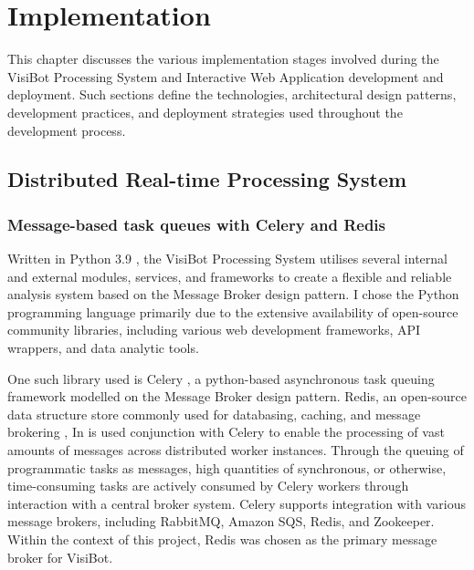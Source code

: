
\chapter{Implementation}


This chapter discusses the various implementation stages involved during the VisiBot Processing System and Interactive Web Application development and deployment. Such sections define the technologies, architectural design patterns, development practices, and deployment strategies used throughout the development process.

\section{Distributed Real-time Processing System}

\subsection{Message-based task queues with Celery and Redis}

Written in Python 3.9 \citep{Python39}, the VisiBot Processing System utilises several internal and external modules, services, and frameworks to create a flexible and reliable analysis system based on the Message Broker design pattern. I chose the Python programming language primarily due to the extensive availability of open-source community libraries, including various web development frameworks, API wrappers, and data analytic tools.

One such library used is Celery \citep{Celery}, a python-based asynchronous task queuing framework modelled on the Message Broker design pattern. Redis, an open-source data structure store commonly used for databasing, caching, and message brokering \citep{Redis}, In is used conjunction with Celery to enable the processing of vast amounts of messages across distributed worker instances. Through the queuing of programmatic tasks as messages, high quantities of synchronous, or otherwise, time-consuming tasks are actively consumed by Celery workers through interaction with a central broker system. Celery supports integration with various message brokers, including RabbitMQ, Amazon SQS, Redis, and Zookeeper. Within the context of this project, Redis was chosen as the primary message broker for VisiBot.

